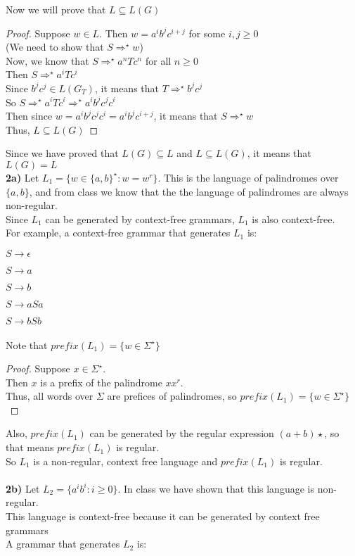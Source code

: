 \documentclass{article}
\begin{document}
Now we will prove that $L \subseteq L(G)$
\begin{proof}
Suppose $w \in L$. Then $w = a^ib^jc^{i+j}$ for some $i,j \ge 0$\\
(We need to show that $S \Rightarrow^\star w$)\\
Now, we know that $S \Rightarrow^\star a^nTc^n$ for all $n \ge 0$\\
Then $S \Rightarrow^\star a^iTc^i$\\
Since $b^jc^j \in L(G_T)$, it means that $T \Rightarrow^\star b^jc^j$\\
So $S \Rightarrow^\star a^iTc^i \Rightarrow^\star a^ib^jc^jc^i$\\
Then since $w = a^ib^jc^jc^i = a^ib^jc^{i+j}$, it means that $S \Rightarrow^\star w$\\
Thus, $L \subseteq L(G)$
\end{proof}

Since we have proved that $L(G) \subseteq L$ and $L \subseteq L(G)$, it means that $L(G) = L$\\

\textbf{2a)} Let $L_1 = \{w \in \{a, b\}^\star : w = w^r\}$. This is the language of palindromes over $\{a, b\}$, and from class we know that the the language of palindromes are always non-regular.\\
\medskip
Since $L_1$ can be generated by context-free grammars, $L_1$ is also context-free.\\
For example, a context-free grammar that generates $L_1$ is:

$S \rightarrow \epsilon$

$S \rightarrow a$

$S \rightarrow b$

$S \rightarrow aSa$

$S \rightarrow bSb$\\ \\
Note that $prefix(L_1) = \{w \in \Sigma^\star\}$
\begin{proof}
Suppose $x \in \Sigma^\star$.\\
Then $x$ is a prefix of the palindrome $xx^r$.\\
Thus, all words over $\Sigma$ are prefices of palindromes, so $prefix(L_1) = \{w \in \Sigma^\star\}$
\end{proof}
Also, $prefix(L_1)$ can be generated by the regular expression $(a+b)\star$, so that means $prefix(L_1)$ is regular.\\
So $L_1$ is a non-regular, context free language and $prefix(L_1)$ is regular.\\ \\
\textbf{2b)} Let $L_2 = \{a^ib^i : i \ge 0\}$. In class we have shown that this language is non-regular.\\
This language is context-free because it can be generated by context free grammars\\
A grammar that generates $L_2$ is:
\end{document}
